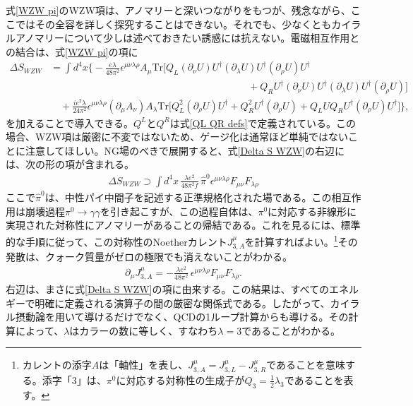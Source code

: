 式\eqref{WZW pi}のWZW項は、アノマリーと深いつながりをもつが、残念ながら、ここではその全容を詳しく探究することはできない。それでも、少なくともカイラルアノマリーについて少しは述べておきたい誘惑には抗えない。電磁相互作用との結合は、式\eqref{WZW pi}の項に
%
{\allowdisplaybreaks[0]\begin{align} \label{Delta S WZW}
	\Delta S_{WZW} &= \int d^4 x \bigg\{ - \frac{e\lambda }{48\pi^2}  \epsilon^{\mu\nu\lambda\rho} A_\mu \mbox{Tr} \big[ Q_L (\partial_\nu U ) U^\dag (\partial_\lambda U ) U^\dag(\partial_\rho U ) U^\dag  \\
	& \qquad \qquad \qquad \qquad \qquad \qquad \qquad \qquad \qquad \qquad + Q_R U^\dag (\partial_\nu U) U^\dag (\partial_\lambda U) U^\dag (\partial_\rho U)\big] \nonumber \\
	& \quad +\frac{i e^2\lambda }{24\pi^2}\epsilon^{\mu\nu\lambda\rho} (\partial_\mu A_\nu) A_\lambda \mbox{Tr} \big[ Q_L^2 (\partial_\rho U)U^\dag + Q_R^2 U^\dag (\partial_\rho U) + Q_L U Q_R U^\dag (\partial_\rho U)U^\dag \big] \bigg\} , \nonumber
\end{align}}
%
を加えることで導入できる。$Q^L$と$Q^R$は式\eqref{QL QR defs}で定義されている。この場合、WZW項は厳密に不変ではないため、ゲージ化は通常ほど単純ではないことに注意してほしい。NG場のべきで展開すると、式\eqref{Delta S WZW}の右辺には、次の形の項が含まれる。
%
\begin{align}
	\Delta S_{WZW} \supset \int d^4 x \, \frac{\lambda e^2 }{48 \pi^2 f} \, \hat \pi^0 \epsilon^{\mu\nu\lambda\rho} F_{\mu\nu} F_{\lambda \rho} 
\end{align}
%
ここで$\hat \pi^0$は、中性パイ中間子を記述する正準規格化された場である。この相互作用は崩壊過程$\pi^0 \to \gamma \gamma$を引き起こすが、この過程自体は、$\pi^0$に対応する非線形に実現された対称性にアノマリーがあることの帰結である。これを見るには、標準的な手順に従って、この対称性のNoetherカレント$J^\mu_{3, A}$を計算すればよい。\footnote{カレントの添字$A$は「軸性」を表し、$J^\mu_{3, A} = J^\mu_{3, L} - J^\mu_{3, R}$であることを意味する。添字「3」は、$\pi^0$に対応する対称性の生成子が$Q_3 = \tfrac{1}{2} \lambda_3$であることを表す。}その発散は、クォーク質量がゼロの極限でも消えないことがわかる。
%
\begin{align} \label{chiral anomaly}
	\partial_\mu J^\mu_{3, A} = - \frac{\lambda e^2 }{48 \pi^2} \, \epsilon^{\mu\nu\lambda\rho} F_{\mu\nu} F_{\lambda \rho} . 
\end{align}
%
右辺は、まさに式\eqref{Delta S WZW}の項に由来する。この結果は、すべてのエネルギーで明確に定義される演算子の間の厳密な関係式である。したがって、カイラル摂動論を用いて導けるだけでなく、QCDの1ループ計算からも導ける。その計算によって、$\lambda$はカラーの数に等しく、すなわち$\lambda = 3$であることがわかる。

